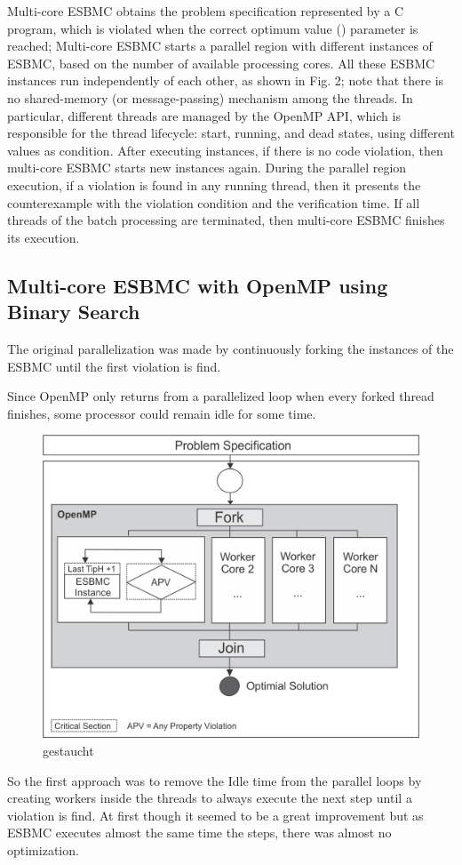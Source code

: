 Multi-core ESBMC obtains the problem specification represented by a C program, which is violated when the correct optimum value () parameter is reached; Multi-core ESBMC starts a parallel region with  different instances of ESBMC, based on the number of available processing cores. All these ESBMC instances run independently of each other, as shown in Fig. 2; note that there is no shared-memory (or message-passing) mechanism among the threads. In particular, different threads are managed by the OpenMP API, which is responsible for the thread lifecycle: start, running, and dead states, using different  values as condition. After executing  instances, if there is no code violation, then multi-core ESBMC starts  new instances again. During the parallel region execution, if a violation is found in any running thread, then it presents the counterexample with the violation condition and the verification time. If all threads of the batch processing are terminated, then multi-core ESBMC finishes its execution.

\subsection{Multi-core ESBMC with OpenMP using Binary Search}
The original parallelization was made by continuously forking the instances of the ESBMC until the first violation is find. 

Since OpenMP only returns from a parallelized loop when every forked thread finishes, some processor could remain idle for some time.
\begin{figure}[ht]
	\centering
  \includegraphics[scale=0.75]{Image/esbmc-parallel.png} 
	\caption{gestaucht}
	\label{fig2}
\end{figure}
So the first approach was to remove the Idle time from the parallel loops by creating workers inside the threads to always execute the next step until a violation is find. At first though it seemed to be a great improvement but as ESBMC executes almost the same time the steps, there was almost no optimization. 

